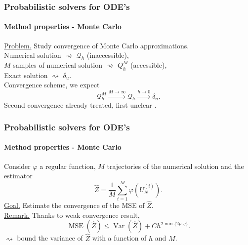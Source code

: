\documentclass{beamer}
\newcommand{\MSE}{\operatorname{MSE}}
\newcommand{\Var}{\operatorname{Var}}
\renewcommand{\phi}{\varphi}
\begin{document}

\begin{frame}
	\frametitle{Probabilistic solvers for ODE's}
	\framesubtitle{Method properties - Monte Carlo}
	
	\underline{Problem.} Study convergence of Monte Carlo approximations. \\[0.5cm]
	Numerical solution $\rightsquigarrow$ $\mathcal Q_h$ (inaccessible), \\
	$M$ samples of numerical solution  $\rightsquigarrow$ $Q_h^M$ (accessible), \\
	Exact solution $\rightsquigarrow$ $\delta_u$. \\[0.5cm]
	
	Convergence scheme, we expect
	\begin{equation*}
	\mathcal Q_h^M \xrightarrow{M\to \infty} \mathcal Q_h \xrightarrow{h\to 0} \delta_u.
	\end{equation*}
	Second convergence already treated, first unclear \cite{KeH16}.
\end{frame}

\begin{frame}
	\frametitle{Probabilistic solvers for ODE's}
	\framesubtitle{Method properties - Monte Carlo}
	
	Consider $\phi$ a regular function, $M$ trajectories of the numerical solution and the estimator
	\begin{equation*}
		\hat Z = \frac{1}{M} \sum_{i = 1}^M \phi\left(U_N^{(i)}\right).
	\end{equation*}
	\underline{Goal.} Estimate the convergence of the MSE of $\hat Z$. \\[0.5cm]
	\underline{Remark.} Thanks to weak convergence result,
	\begin{equation*}
		\MSE(\hat Z) \leq \Var(\hat Z) + C h^{2\min\{2p, q\}}.
	\end{equation*}
	$\rightsquigarrow$ bound the variance of $\hat Z$ with a function of $h$ and $M$.
\end{frame}
\end{document}
